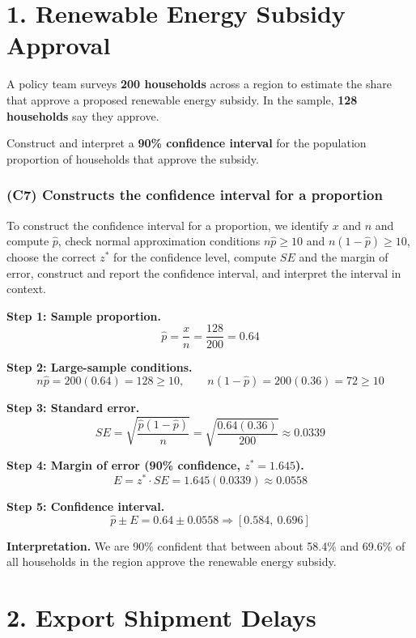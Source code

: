 

	
	\section*{1. Renewable Energy Subsidy Approval}
		

	A policy team surveys \textbf{200 households} across a region to estimate the share that approve a proposed renewable energy subsidy. In the sample, \textbf{128 households} say they approve.
	
	Construct and interpret a \textbf{90\% confidence interval} for the population proportion of households that approve the subsidy.
	
	\subsubsection*{(C7) Constructs the confidence interval for a proportion}
	To construct the confidence interval for a proportion, we identify \(x\) and \(n\) and compute \(\hat{p}\), check normal approximation conditions \(n\hat{p} \ge 10\) and \(n(1-\hat{p}) \ge 10\), choose the correct \(z^*\) for the confidence level, compute \(SE\) and the margin of error, construct and report the confidence interval, and interpret the interval in context.
	
	\textbf{Step 1: Sample proportion.}
	\[
	\hat{p} = \frac{x}{n} = \frac{128}{200} = 0.64
	\]
	
	\textbf{Step 2: Large-sample conditions.}
	\[
	n\hat{p} = 200(0.64) = 128 \ge 10, \qquad n(1-\hat{p}) = 200(0.36) = 72 \ge 10
	\]
	
	\textbf{Step 3: Standard error.}
	\[
	SE = \sqrt{\frac{\hat{p}(1-\hat{p})}{n}} = \sqrt{\frac{0.64(0.36)}{200}} \approx 0.0339
	\]
	
	\textbf{Step 4: Margin of error (90\% confidence, \(z^* = 1.645\)).}
	\[
	E = z^* \cdot SE = 1.645(0.0339) \approx 0.0558
	\]
	
	\textbf{Step 5: Confidence interval.}
	\[
	\hat{p} \pm E = 0.64 \pm 0.0558 \Rightarrow [0.584,\ 0.696]
	\]
	
	\textbf{Interpretation.}
	We are 90\% confident that between about 58.4\% and 69.6\% of all households in the region approve the renewable energy subsidy.
	
	\section*{2. Export Shipment Delays}
	
